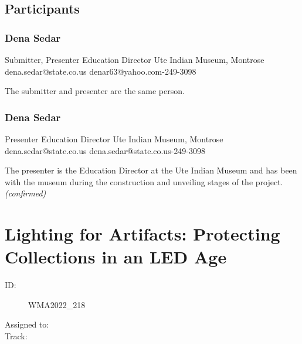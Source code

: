 \documentclass{report}
\begin{document}
            \subsection*{Participants}
              \subsubsection*{ Dena Sedar }
              Submitter, Presenter\newline
              Education Director\newline
              Ute Indian Museum, Montrose
              \newline
              dena.sedar@state.co.us\newline
              denar63@yahoo.com-249-3098\newline

              The submitter and presenter are the same person.\newline


              

              
                \subsubsection*{ Dena Sedar }
                Presenter\newline
                Education Director\newline
                Ute Indian Museum, Montrose
                \newline
                dena.sedar@state.co.us\newline
                dena.sedar@state.co.us-249-3098\newline

                The presenter is the Education Director at the Ute Indian Museum and has been with the museum during the construction and unveiling stages of the project.
                \emph{ (confirmed) }
              

              

              

              
        
          \newpage
          \section{ Lighting for Artifacts: Protecting Collections in an LED Age }
            \begin{description}
              \item [ID:]
              WMA2022\_218

              \item [Assigned to:]
                \item [Track:]
              \end{description}
\end{document}

